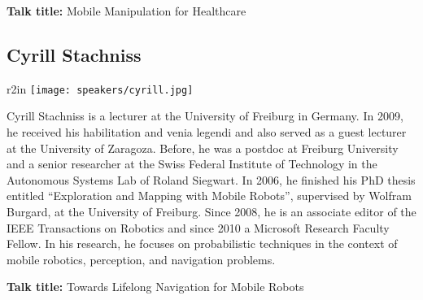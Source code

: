 \bigskip
{\bf Talk title:} Mobile Manipulation for Healthcare

\subsection*{Cyrill Stachniss}
\begin{wrapfigure}{r}{2in}
\centering
\texttt{[image: speakers/cyrill.jpg]}
\end{wrapfigure}

Cyrill Stachniss is a lecturer at the University of Freiburg in Germany. In 2009, he received his habilitation and venia legendi and also served as a guest lecturer at the University of Zaragoza.  Before, he was a postdoc at Freiburg University and a senior researcher at the Swiss Federal Institute of Technology in the Autonomous Systems Lab of Roland Siegwart. In 2006, he finished his PhD thesis entitled ``Exploration and Mapping with Mobile Robots'', supervised by Wolfram Burgard, at the University of Freiburg. Since 2008, he is an associate editor of the IEEE Transactions on Robotics and since 2010 a Microsoft Research Faculty Fellow. In his research, he focuses on probabilistic techniques in the context of mobile robotics, perception, and navigation problems.

\bigskip
{\bf Talk title:} Towards Lifelong Navigation for Mobile Robots




